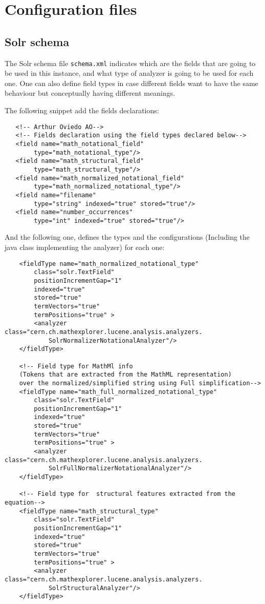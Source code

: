 \chapter{Configuration files}
\label{appendix-conf_files}

\section{Solr schema}
The Solr schema file \verb|schema.xml| indicates which are the fields that are going to be used in this instance, and what type of analyzer is going to be used for each one. One can also define field types in case different fields want to have the same behaviour but conceptually having different meanings. 

The following snippet add the fields declarations:

\begin{verbatim}
   <!-- Arthur Oviedo AO-->
   <!-- Fields declaration using the field types declared below-->
   <field name="math_notational_field" 
   		type="math_notational_type"/>
   <field name="math_structural_field" 
   		type="math_structural_type"/>
   <field name="math_normalized_notational_field" 
   		type="math_normalized_notational_type"/>
   <field name="filename" 
   		type="string" indexed="true" stored="true"/>
   <field name="number_occurrences" 
   		type="int" indexed="true" stored="true"/>
\end{verbatim}

And the following one, defines the types and the configurations (Including the java class implementing the analyzer) for each one:

\begin{verbatim}
	<fieldType name="math_normalized_notational_type" 
		class="solr.TextField" 
		positionIncrementGap="1"
		indexed="true" 
		stored="true" 
		termVectors="true" 
		termPositions="true" >
		<analyzer class="cern.ch.mathexplorer.lucene.analysis.analyzers.
			SolrNormalizerNotationalAnalyzer"/>
	</fieldType>
	
	<!-- Field type for MathMl info 
	(Tokens that are extracted from the MathML representation)
	over the normalized/simplified string using Full simplification-->
	<fieldType name="math_full_normalized_notational_type" 
		class="solr.TextField" 
		positionIncrementGap="1"
		indexed="true" 
		stored="true" 
		termVectors="true" 
		termPositions="true" >
		<analyzer class="cern.ch.mathexplorer.lucene.analysis.analyzers.
			SolrFullNormalizerNotationalAnalyzer"/>
	</fieldType>
	
	<!-- Field type for  structural features extracted from the equation-->
	<fieldType name="math_structural_type" 
		class="solr.TextField" 
		positionIncrementGap="1"
		indexed="true" 
		stored="true" 
		termVectors="true" 
		termPositions="true" >
		<analyzer class="cern.ch.mathexplorer.lucene.analysis.analyzers.
			SolrStructuralAnalyzer"/>
	</fieldType>

\end{verbatim}
 

